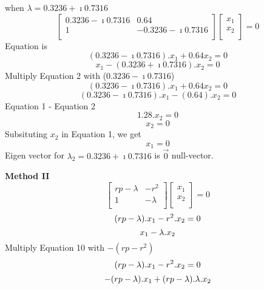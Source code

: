 \documentclass[a4paper,10pt]{article}
\begin{document}
 when $\lambda = 0.3236 + \imath0.7316$
 \[
   \left[
     \begin{array}{cc}
       0.3236-\imath0.7316 & 0.64\\
       1 & -0.3236-\imath0.7316\\
     \end{array}
   \right]
   \left[
     \begin{array}{c}
       x_1\\
       x_2\\
     \end{array}
   \right] = 0
 \]
 Equation is
 \begin{equation}
   (0.3236-\imath0.7316).x_1 + 0.64x_2 = 0
 \end{equation}
  \begin{equation}
   x_1 - (0.3236+\imath0.7316).x_2 = 0
 \end{equation} 
 Multiply Equation 2 with ($0.3236-\imath0.7316$)
  \begin{equation}
   (0.3236-\imath0.7316).x_1 + 0.64x_2 = 0
 \end{equation}
  \begin{equation}
   (0.3236-\imath0.7316).x_1 - (0.64).x_2 = 0
 \end{equation}
 Equation 1 - Equation 2\\
   \[1.28.x_2 = 0\]
   \[ x_2 = 0\]
 Subsituting $x_2$ in Equation 1, we get\\
   \[ x_1 = 0 \]
 Eigen vector for $\lambda_2 = 0.3236 + \imath0.7316$ is $\overrightarrow{0}$ null-vector.
 
 \pagebreak
 \large{\bf{Method II}}
  \[
   \left[
     \begin{array}{cc}
       rp-\lambda & -r^2\\
       1 & -\lambda\\
     \end{array}
   \right]
   \left[
     \begin{array}{c}
       x_1\\
       x_2\\
     \end{array}
   \right] = 0
 \]
 \begin{equation}
   (rp-\lambda).x_1 - r^2.x_2 = 0\\
 \end{equation}
 \begin{equation}
   x_1 - \lambda.x_2\\
 \end{equation}
 Multiply Equation 10 with $ -(rp - r^2) $\\
  \begin{equation}
   (rp-\lambda).x_1 - r^2.x_2 = 0\\
 \end{equation}
 \begin{equation}
   -(rp-\lambda).x_1 + (rp-\lambda).\lambda.x_2\\
 \end{equation}
\end{document}
